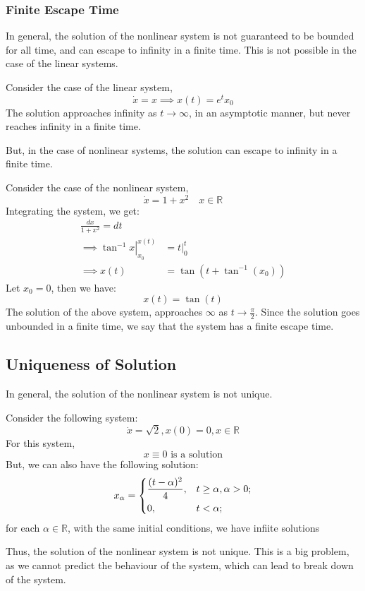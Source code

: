 \subsubsection{Finite Escape Time}
In general, the solution of the nonlinear system is not guaranteed to be bounded for all time, and 
can escape to infinity in a finite time. This is not possible in the case of the linear systems.
\begin{example}
    Consider the case of the linear system,
    \[
        \dot{x} = x \implies x(t) = e^{t} x_0
    \]
    The solution approaches infinity as \(t \to \infty\), in an asymptotic manner, but never reaches
    infinity in a finite time.
\end{example}\vspace{1em}
But, in the case of nonlinear systems, the solution can escape to infinity in a finite time.
\begin{example}
    Consider the case of the nonlinear system,
    \[
        \dot{x} = 1 + x^{2} \quad x \in \mathbb{R} 
    \]
    Integrating the system, we get:
    \[
        \begin{aligned}
            \frac{dx}{1+x^{2}} = dt \\
            \implies \left. \tan^{-1} x \right|_{x_0}^{x(t)} &= \left. t \right|_{0}^{t} \\
            \implies x(t) &= \tan(t + \tan^{-1}(x_0))
        \end{aligned}
    \]
    Let \(x_0 = 0\), then we have:
    \[
        x(t) = \tan(t)
    \]
    The solution of the above system, approaches \(\infty\) as \(t \to \frac{\pi}{2}\). Since the solution
    goes unbounded in a finite time, we say that the system has a finite escape time.  
\end{example}

\subsection{Uniqueness of Solution}
In general, the solution of the nonlinear system is not unique. 
\begin{example}
    Consider the following system:
    \[
        \dot{x} = \sqrt{2} ,x(0) = 0 , x \in \mathbb{R}  
    \]
    For this system,
    \[
        x \equiv 0 \text{ is a solution}
    \]
    But, we can also have the following solution:
    \[
        x_\alpha = \begin{dcases}
            \frac{(t - \alpha)^{2}}{4}, & t \geq \alpha, \alpha > 0 ;\\
            0 , & t< \alpha  ;\\
        \end{dcases}
    \]
    for each \(\alpha \in \mathbb{R}\), with the same initial conditions, we have infiite solutions 
\end{example}
Thus, the solution of the nonlinear system is not unique.
This is a big problem, as we cannot predict the behaviour of the system, which can lead to break
down of the system.